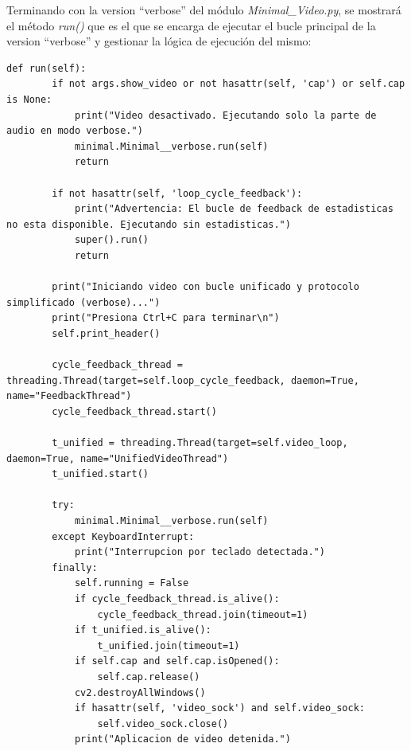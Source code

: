 Terminando con la version ``verbose'' del módulo \textit{Minimal\_Video.py}, se mostrará el método \textit{run()} que es el que se encarga de ejecutar el bucle principal de la version ``verbose'' y gestionar la lógica de ejecución del mismo:
\begin{lstlisting}[style=pythonstyle, caption={Método run() de \textit{Minimal\_Video\_verbose}}, label={lst:run_minimal_video_verbose}]
def run(self):
        if not args.show_video or not hasattr(self, 'cap') or self.cap is None:
            print("Video desactivado. Ejecutando solo la parte de audio en modo verbose.")
            minimal.Minimal__verbose.run(self)
            return

        if not hasattr(self, 'loop_cycle_feedback'):
            print("Advertencia: El bucle de feedback de estadisticas no esta disponible. Ejecutando sin estadisticas.")
            super().run()
            return

        print("Iniciando video con bucle unificado y protocolo simplificado (verbose)...")
        print("Presiona Ctrl+C para terminar\n")
        self.print_header()

        cycle_feedback_thread = threading.Thread(target=self.loop_cycle_feedback, daemon=True, name="FeedbackThread")
        cycle_feedback_thread.start()

        t_unified = threading.Thread(target=self.video_loop, daemon=True, name="UnifiedVideoThread")
        t_unified.start()

        try:
            minimal.Minimal__verbose.run(self)
        except KeyboardInterrupt:
            print("Interrupcion por teclado detectada.")
        finally:
            self.running = False
            if cycle_feedback_thread.is_alive():
                cycle_feedback_thread.join(timeout=1)
            if t_unified.is_alive():
                t_unified.join(timeout=1)
            if self.cap and self.cap.isOpened():
                self.cap.release()
            cv2.destroyAllWindows()
            if hasattr(self, 'video_sock') and self.video_sock:
                self.video_sock.close()
            print("Aplicacion de video detenida.")
\end{lstlisting}
\vspace{\baselineskip}

